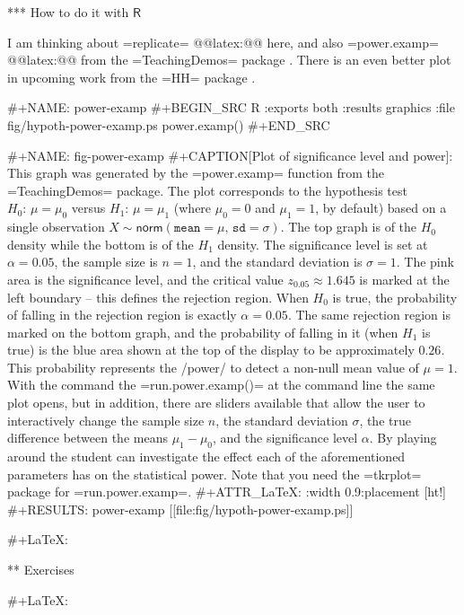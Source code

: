 *** How to do it with \(\mathsf{R}\)

I am thinking about =replicate= @@latex:@@
here, and also =power.examp= @@latex:@@
from the =TeachingDemos= package \cite{TeachingDemos}. There is an
even better plot in upcoming work from the =HH= package \cite{HH}.

#+NAME: power-examp
#+BEGIN_SRC R :exports both :results graphics :file fig/hypoth-power-examp.ps
power.examp()
#+END_SRC

#+NAME: fig-power-examp
#+CAPTION[Plot of significance level and power]: \small This graph was generated by the =power.examp= function from the =TeachingDemos= package. The plot corresponds to the hypothesis test \(H_{0}:\,\mu=\mu_{0}\) versus \(H_{1}:\,\mu=\mu_{1}\) (where \(\mu_{0}=0\) and \(\mu_{1}=1\), by default) based on a single observation \(X\sim\mathsf{norm}(\mathtt{mean}=\mu,\,\mathtt{sd}=\sigma)\). The top graph is of the \(H_{0}\) density while the bottom is of the \(H_{1}\) density. The significance level is set at \(\alpha=0.05\), the sample size is \(n=1\), and the standard deviation is \(\sigma=1\). The pink area is the significance level, and the critical value \(z_{0.05}\approx1.645\) is marked at the left boundary -- this defines the rejection region. When \(H_{0}\) is true, the probability of falling in the rejection region is exactly \(\alpha=0.05\). The same rejection region is marked on the bottom graph, and the probability of falling in it (when \(H_{1}\)  is true) is the blue area shown at the top of the display to be approximately \(0.26\). This probability represents the /power/ to detect a non-null mean value of \(\mu=1\). With the command the =run.power.examp()= at the command line the same plot opens, but in addition, there are sliders available that allow the user to interactively change the sample size \(n\), the standard deviation \(\sigma\), the true difference between the means \(\mu_{1}-\mu_{0}\), and the significance level \(\alpha\). By playing around the student can investigate the effect each of the aforementioned parameters has on the statistical power. Note that you need the =tkrplot= package \cite{tkrplot} for =run.power.examp=.
#+ATTR_LaTeX: :width 0.9\textwidth :placement [ht!]
#+RESULTS: power-examp
[[file:fig/hypoth-power-examp.ps]]

#+LaTeX: \newpage{}

** Exercises

#+LaTeX: \setcounter{thm}{0}
